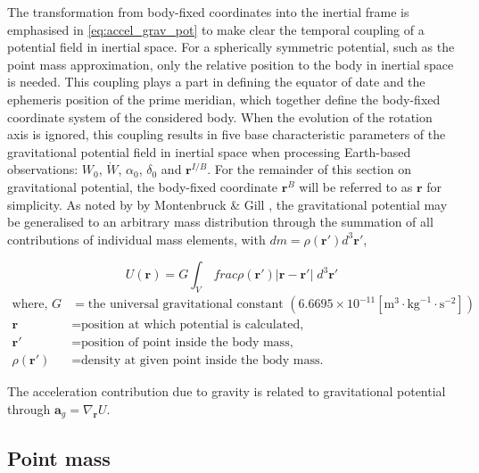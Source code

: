 The transformation from body-fixed coordinates into the inertial frame is
emphasised in \autoref{eq:accel_grav_pot} to make clear the temporal coupling of
a potential field in inertial space. For a spherically symmetric potential, such
as the point mass approximation, only the relative position to the body in
inertial space is needed. This coupling plays a part in defining the equator of
date and the ephemeris position of the prime meridian, which together define the
body-fixed coordinate system of the considered body. When the evolution of the
rotation axis is ignored, this coupling results in five base characteristic
parameters of the gravitational potential field in inertial space when
processing Earth-based observations: $W_0$, $\dot{W}$, $\alpha_0$, $\delta_0$
and $\mathbf{r}^{I/B}$. For the remainder of this section on gravitational
potential, the body-fixed coordinate $\mathbf{r}^B$ will be referred to as
$\mathbf{r}$ for simplicity. As noted by by Montenbruck \& Gill
\cite{Montenbruck2000}, the gravitational potential may be generalised to an
arbitrary mass distribution through the summation of all contributions of
individual mass elements, with $dm=\rho{(\mathbf{r'})}d^3\mathbf{r'}$,

\begin{equation}
    U(\mathbf{r}) = G\int_V\ frac{\rho{(\mathbf{r'})}}{|\mathbf{r}-\mathbf{r'}|}\;d^3\mathbf{r'}
\end{equation}
\begin{equation*}
    \begin{aligned}
        \textrm{where, }
        G &= \textrm{the universal gravitational constant }(6.6695\times{}10^{-11} [\textrm{m}^3\cdot{}\textrm{kg}^{-1}\cdot{}\textrm{s}^{-2}])\\
        \mathbf{r}       &= \textrm{position at which potential is calculated,} \\
        \mathbf{r'}       &= \textrm{position of point inside the body mass,}\\
        \rho(\mathbf{r'}) &= \textrm{density at given point inside the body mass.}
    \end{aligned}
\end{equation*}

The acceleration contribution due to gravity is related to gravitational
potential through $\mathbf{a}_g=\nabla_\mathbf{r}{U}$.

\subsection{Point mass}

